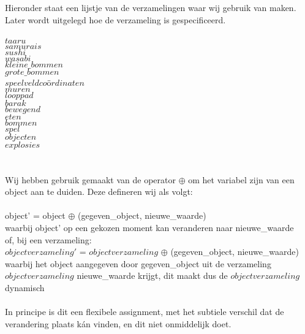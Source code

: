 
Hieronder staat een lijstje van de verzamelingen waar wij gebruik van maken. Later wordt uitgelegd hoe de verzameling is gespecificeerd. \\ \ \\
$taaru$ \\
$samurais$ \\
$sushi$ \\
$wasabi$ \\
$kleine\_bommen$ \\
$grote\_bommen$ \\
$speelveldco$\"o$rdinaten $ \\
$muren$ \\
$looppad$ \\
$barak$\\
$bewegend$\\
$eten$ \\
$bommen$ \\
$spel$ \\
$objecten$ \\
$explosies$ \\
\\
\\
Wij hebben gebruik gemaakt van de operator $\oplus$ om het variabel zijn van een object aan te duiden. Deze defineren wij als volgt: \\
\\
object' = object $\oplus$ (gegeven\_object, nieuwe\_waarde) \\
waarbij object' op een gekozen moment kan veranderen naar nieuwe\_waarde \\
of, bij een verzameling: \\
$objectverzameling'$ = $objectverzameling$ $\oplus$ (gegeven\_object, nieuwe\_waarde) \\
waarbij het object aangegeven door gegeven\_object uit de verzameling $objectverzameling$ nieuwe\_waarde krijgt, dit maakt dus de $objectverzameling$ dynamisch \\
\\
In principe is dit een flexibele assignment, met het subtiele verschil dat de verandering plaats k\'an vinden, en dit niet onmiddelijk doet.


